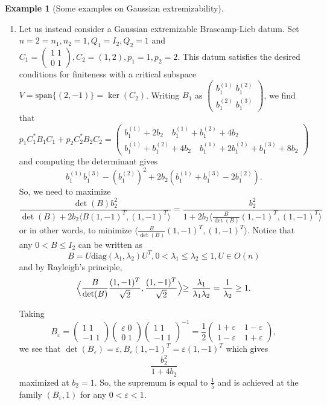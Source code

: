 \documentclass[11pt,a4paper,reqno]{amsart}
\numberwithin{equation}{section}
\theoremstyle{definition}
\newtheorem{example}[theorem]{Example}
\newcommand{\<}{\ensuremath \leq}
\renewcommand{\>}{\ensuremath \geq}
\renewcommand{\epsilon}{\varepsilon}
\begin{document}
\begin{example}[Some examples on Gaussian extremizability]
\begin{enumerate}
    
    \item[(ii)] Let us instead consider a Gaussian extremizable Brascamp-Lieb datum. 
    Set $n=2=n_1,n_2=1, Q_1=I_2, Q_2=1$ and $C_1=\begin{pmatrix}
        1 \; 1 \\
        0 \; 1
    \end{pmatrix}, C_2=(1,2), p_1=1,p_2=2.$ This datum satisfies the desired conditions for finiteness with a critical subspace $V=\mathrm{span}\{(2,-1)\}=\ker(C_2)$. Writing $B_1$ as $\begin{pmatrix}
        b_1^{(1)} \; b_1^{(2)} \\
        b_1^{(2)} \; b_1^{(3)}
    \end{pmatrix}$, we find that $$p_1C_1^*B_1C_1+p_2C_2^*B_2C_2=\begin{pmatrix}
        b_1^{(1)}+2b_2 \quad b_1^{(1)}+b_1^{(2)}+4b_2 \\
        b_1^{(1)}+b_1^{(2)}+4b_2 \quad b_1^{(1)}+2b_1^{(2)}+b_1^{(3)}+8b_2
    \end{pmatrix}$$ and computing the determinant gives $$b_1^{(1)}b_1^{(3)}-(b_1^{(2)})^2+2b_2(b_1^{(1)}+b_1^{(3)}-2b_1^{(2)}).$$ 
    So, we need to maximize $$\frac{\det(B)b_2^2}{\det(B)+2b_2\langle B(1,-1)^T,(1,-1)^T\rangle}=\frac{b_2^2}{1+2b_2\langle \frac{B}{\det(B)}(1,-1)^T,(1,-1)^T\rangle}$$ or in other words, to minimize $\langle \frac{B}{\det(B)}(1,-1)^T,(1,-1)^T\rangle.$
Notice that any $0<B \leq I_2$ can be written as $$B=U\mathrm{diag}(\lambda_1,\lambda_2)U^T, 0<\lambda_1 \leq \lambda_2 \leq 1, U \in O(n)$$ and by Rayleigh's principle, $$\Bigl \langle \frac{B}{\det(B)}\frac{(1,-1)^T}{\sqrt 2},\frac{(1,-1)^T}{\sqrt 2}\Bigl \rangle \geq \frac{\lambda_1}{\lambda_1 \lambda_2}=\frac{1}{\lambda_2} \geq 1.$$
    
    Taking $$B_\epsilon=\begin{pmatrix}
        1 \; 1 \\
        -1 \; 1
    \end{pmatrix} \begin{pmatrix}
        \epsilon \; 0 \\
        0 \; 1
    \end{pmatrix} \begin{pmatrix}
        1 \; 1 \\
        -1 \; 1
    \end{pmatrix}^{-1}=\frac{1}{2}\begin{pmatrix}
        1+\epsilon \quad 1-\epsilon \\
        1-\epsilon \quad 1+\epsilon
    \end{pmatrix},$$ we see that $\det(B_\epsilon)=\epsilon, B_\epsilon(1,-1)^T=\epsilon(1,-1)^T$ which gives $$\frac{b_2^2}{1+4b_2}$$ maximized at $b_2=1$. So, the supremum is equal to $\frac{1}{5}$ and is achieved at the family $(B_\epsilon,1)$ for any $0<\epsilon<1$. 
\end{enumerate}
\end{example}
\end{document}
